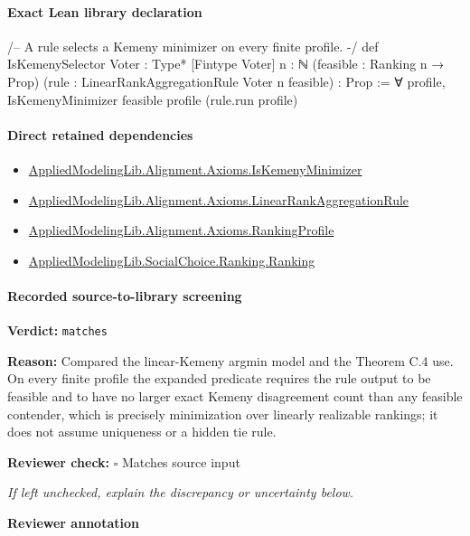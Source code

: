 \documentclass[10pt]{article}
\newcommand{\reviewerbox}{%
  \par\noindent\fbox{\parbox{0.96\linewidth}{\rule{0pt}{0.38in}}}\par
}
\newcommand{\reviewmatch}[1]{%
  \par\noindent\textbf{Reviewer check:} $\square$\; #1\par
  \noindent\emph{If left unchecked, explain the discrepancy or uncertainty below.}\par
}
\begin{document}
\paragraph{Exact Lean library declaration}
\begin{ReviewVerbatim}
/-- A rule selects a Kemeny minimizer on every finite profile. -/
def IsKemenySelector {Voter : Type*} [Fintype Voter] {n : ℕ}
    (feasible : Ranking n → Prop) (rule : LinearRankAggregationRule Voter n feasible) : Prop :=
  ∀ profile, IsKemenyMinimizer feasible profile (rule.run profile)
\end{ReviewVerbatim}

\paragraph{Direct retained dependencies}
\begin{itemize}\raggedright
\item \hyperlink{governing-declaration-d5e7d2376e0718c7}{Applied\allowbreak{}Modeling\allowbreak{}Lib.\allowbreak{}Alignment.\allowbreak{}Axioms.\allowbreak{}Is\allowbreak{}Kemeny\allowbreak{}Minimizer}
\item \hyperlink{library-prerequisite-43447e121a1884f9}{Applied\allowbreak{}Modeling\allowbreak{}Lib.\allowbreak{}Alignment.\allowbreak{}Axioms.\allowbreak{}Linear\allowbreak{}Rank\allowbreak{}Aggregation\allowbreak{}Rule}
\item \hyperlink{library-prerequisite-9bded048a60dfe0a}{Applied\allowbreak{}Modeling\allowbreak{}Lib.\allowbreak{}Alignment.\allowbreak{}Axioms.\allowbreak{}Ranking\allowbreak{}Profile}
\item \hyperlink{library-prerequisite-5cde54446d1ae021}{Applied\allowbreak{}Modeling\allowbreak{}Lib.\allowbreak{}Social\allowbreak{}Choice.\allowbreak{}Ranking.\allowbreak{}Ranking}
\end{itemize}
\paragraph{Recorded source-to-library screening}
\textbf{Verdict:} \texttt{matches}
\\
{\raggedright
\textbf{Reason:} Compared the linear-\allowbreak{}Kemeny argmin model and the Theorem C.\allowbreak{}4 use.\allowbreak{} On every finite profile the expanded predicate requires the rule output to be feasible and to have no larger exact Kemeny disagreement count than any feasible contender, which is precisely minimization over linearly realizable rankings;\allowbreak{} it does not assume uniqueness or a hidden tie rule.\allowbreak{}
\par}
\reviewmatch{Matches source input}
\noindent\textbf{Reviewer annotation}\par
\reviewerbox
\clearpage
\hypertarget{library-prerequisite-a68d66923a3c5526}{}
\end{document}
